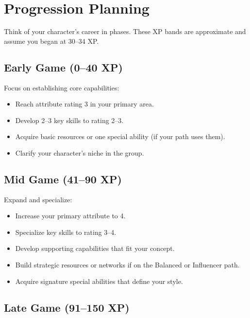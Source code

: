 
\section{Progression Planning}
\label{sec:xp-progression}

Think of your character's career in phases. These XP bands are approximate and
assume you began at 30--34 XP.

\subsection*{Early Game (0--40 XP)}
\label{sec:xp-early-game}

Focus on establishing core capabilities:
\begin{itemize}
\item Reach attribute rating 3 in your primary area.
\item Develop 2--3 key skills to rating 2--3.
\item Acquire basic resources or one special ability (if your path uses them).
\item Clarify your character's niche in the group.
\end{itemize}

\subsection*{Mid Game (41--90 XP)}
\label{sec:xp-mid-game}

Expand and specialize:
\begin{itemize}
\item Increase your primary attribute to 4.
\item Specialize key skills to rating 3--4.
\item Develop supporting capabilities that fit your concept.
\item Build strategic resources or networks if on the Balanced or Influencer path.
\item Acquire signature special abilities that define your style.
\end{itemize}

\subsection*{Late Game (91--150 XP)}
\label{sec:xp-late-game}

